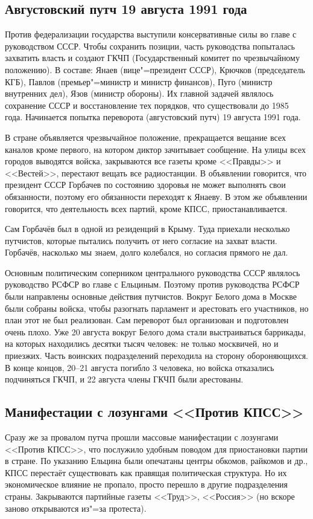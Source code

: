 \subsection{Августовский путч 19 августа 1991 года}

Против федерализации государства выступили консервативные силы во главе с руководством СССР. Чтобы сохранить позиции, часть руководства попыталась захватить власть и создают ГКЧП (Государственный комитет по чрезвычайному положению). В составе: Янаев (вице"=президент СССР), Крючков (председатель КГБ), Павлов (премьер"=министр и министр финансов), Пуго (министр внутренних дел), Язов (министр обороны). Их главной задачей являлось сохранение СССР и восстановление тех порядков, что существовали до 1985 года. 
Начинается попытка переворота (августовский путч) 19 августа 1991 года. 

В стране объявляется чрезвычайное положение, прекращается вещание всех каналов кроме первого, на котором диктор зачитывает сообщение. На улицы всех городов выводятся войска, закрываются все газеты кроме <<Правды>> и <<Вестей>>, перестают вещать все радиостанции. В объявлении говорится, что президент СССР Горбачев по состоянию здоровья не может выполнять свои обязанности, поэтому его обязанности переходят к Янаеву. В этом же объявлении говорится, что деятельность всех партий, кроме КПСС, приостанавливается.

Сам Горбачёв был в одной из резиденций в Крыму. Туда приехали несколько путчистов, которые пытались получить от него согласие на захват власти. Горбачёв, насколько мы знаем, долго колебался, но согласия прямого не дал.

Основным политическим соперником центрального руководства СССР являлось руководство РСФСР во главе с Ельциным. Поэтому против руководства РСФСР были направлены основные действия путчистов. Вокруг Белого дома в Москве были собраны войска, чтобы разогнать парламент и арестовать его участников, но план этот не был реализован. Сам переворот был организован и подготовлен очень плохо. Уже 20 августа вокруг Белого дома стали выстраиваться баррикады, на которых находились десятки тысяч человек: не только москвичей, но и приезжих. Часть воинских подразделений переходила на сторону обороняющихся. В конце концов, 20--21 августа погибло 3 человека, но войска отказались подчиняться ГКЧП, и 22 августа члены ГКЧП были арестованы. 

\subsection{Манифестации с лозунгами <<Против КПСС>>}
Сразу же за провалом путча прошли массовые манифестации с лозунгами <<Против КПСС>>, что послужило удобным поводом для приостановки партии в стране. По указанию Ельцина были опечатаны центры обкомов, райкомов и др., КПСС перестаёт существовать как правящая политическая структура. Но их экономическое влияние не пропало, просто перешло в другие подразделения страны. Закрываются партийные газеты <<Труд>>, <<Россия>> (но вскоре заново открываются из"=за протеста).

